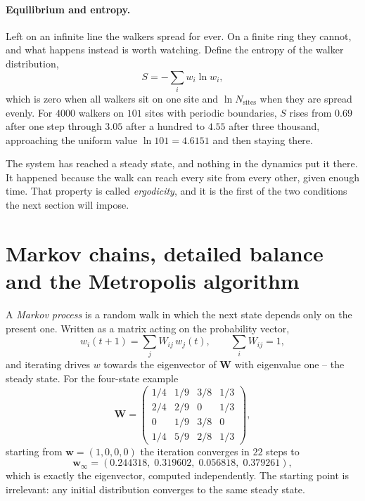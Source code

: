 \paragraph{Equilibrium and entropy.}
Left on an infinite line the walkers spread for ever.  On a finite ring they
cannot, and what happens instead is worth watching.  Define the entropy of the
walker distribution,
\begin{equation}
  S = -\sum_i w_i\ln w_i ,
  \label{eq:12-entropy}
\end{equation}
which is zero when all walkers sit on one site and $\ln N_{\mathrm{sites}}$
when they are spread evenly.  For $4000$ walkers on $101$ sites with periodic
boundaries, $S$ rises from $0.69$ after one step through $3.05$ after a
hundred to $4.55$ after three thousand, approaching the uniform value
$\ln 101 = 4.6151$ and then staying there.

The system has reached a steady state, and nothing in the dynamics put it
there.  It happened because the walk can reach every site from every other,
given enough time.  That property is called \emph{ergodicity}, and it is the
first of the two conditions the next section will impose.

\section{Markov chains, detailed balance and the Metropolis algorithm}
\label{sec:metropolis}

A \emph{Markov process} is a random walk in which the next state depends only
on the present one.  Written as a matrix acting on the probability vector,
\begin{equation}
  w_i(t+1) = \sum_j W_{ij}\,w_j(t),
  \qquad \sum_i W_{ij} = 1 ,
  \label{eq:12-markov}
\end{equation}
and iterating drives $w$ towards the eigenvector of $\bm{W}$ with eigenvalue
one -- the steady state.  For the four-state example
\begin{equation}
  \bm{W} = \begin{pmatrix}
    1/4 & 1/9 & 3/8 & 1/3\\
    2/4 & 2/9 & 0   & 1/3\\
    0   & 1/9 & 3/8 & 0\\
    1/4 & 5/9 & 2/8 & 1/3
  \end{pmatrix},
  \label{eq:12-examplematrix}
\end{equation}
starting from $\bm{w}=(1,0,0,0)$ the iteration converges in $22$ steps to
\[
  \bm{w}_{\infty} =
  (0.244318,\;0.319602,\;0.056818,\;0.379261),
\]
which is exactly the eigenvector, computed independently.  The starting point
is irrelevant: any initial distribution converges to the same steady state.

